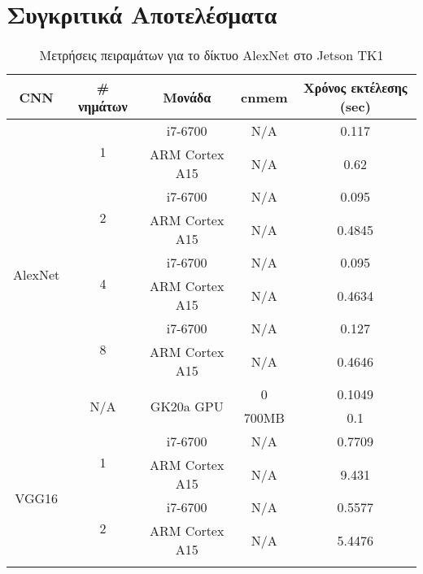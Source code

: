 \section{Συγκριτικά Αποτελέσματα}
\label{sec:experiments_comparative}

\begin{table}[H]
  \begin{center}
    \caption{Μετρήσεις πειραμάτων για το δίκτυο AlexNet στο Jetson TK1}
    \label{tab:results_comparative}
    \small
    \begin{tabular}[center]{ | c | c | c | c | c | }
      \hline
      \rowcolor{Gray}
      CNN & \# νημάτων & Μονάδα & cnmem & Χρόνος εκτέλεσης (sec) \\
      \hline
      \multirow{10}{*}{AlexNet} & \multirow{2}{*}{1}    & i7-6700 & N/A & 0.117 \\ \cline{3-5}
                                &                       & ARM Cortex A15 & N/A & 0.62 \\ \cline{2-5}
                                & \multirow{2}{*}{2}    & i7-6700 & N/A & 0.095 \\ \cline{3-5}
                                &                       & ARM Cortex A15 & N/A & 0.4845 \\ \cline{2-5}
                                & \multirow{2}{*}{4}    & i7-6700 & N/A & 0.095 \\ \cline{3-5}
                                &                       & ARM Cortex A15 & N/A & 0.4634 \\ \cline{2-5}
                                & \multirow{2}{*}{8}    & i7-6700 & N/A & 0.127 \\ \cline{3-5}
                                &                       & ARM Cortex A15 & N/A & 0.4646 \\ \cline{2-5}
                                & \multirow{2}{*}{N/A}  & \multirow{2}{*}{GK20a GPU} & 0 & 0.1049 \\ \cline{4-5}
                                &                       &                            & 700MB & 0.1 \\ \hline
      \multirow{10}{*}{VGG16}   & \multirow{2}{*}{1}    & i7-6700 & N/A & 0.7709 \\ \cline{3-5}
                                &                       & ARM Cortex A15 & N/A & 9.431 \\ \cline{2-5}
                                & \multirow{2}{*}{2}    & i7-6700 & N/A & 0.5577 \\ \cline{3-5}
                                &                       & ARM Cortex A15 & N/A & 5.4476 \\ \cline{2-5}

\end{tabular}
\end{center}
\end{table}
